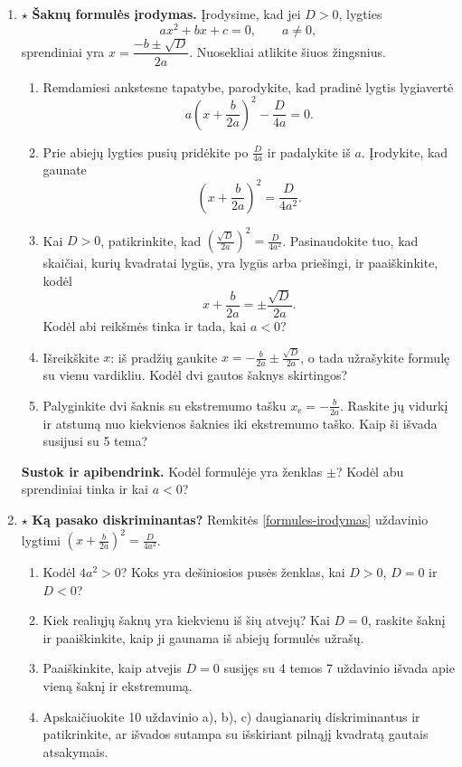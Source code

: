 \documentclass[12pt,a4paper]{article}
\begin{document}
\begin{enumerate}
\begin{enumerate}
\end{enumerate}
\item\label{formules-irodymas} $\star$ \textbf{Šaknų formulės įrodymas.} Įrodysime, kad jei $D>0$, lygties
\[
ax^2+bx+c=0,\qquad a\ne0,
\]
sprendiniai yra $x=\dfrac{-b\pm\sqrt D}{2a}$. Nuosekliai atlikite šiuos žingsnius.
\begin{enumerate}
\item Remdamiesi ankstesne tapatybe, parodykite, kad pradinė lygtis lygiavertė
\[
a\left(x+\frac{b}{2a}\right)^2-\frac{D}{4a}=0.
\]
\item Prie abiejų lygties pusių pridėkite po $\frac{D}{4a}$ ir padalykite iš $a$. Įrodykite, kad gaunate
\[
\left(x+\frac{b}{2a}\right)^2=\frac{D}{4a^2}.
\]
\item Kai $D>0$, patikrinkite, kad $\left(\frac{\sqrt D}{2a}\right)^2=\frac{D}{4a^2}$. Pasinaudokite tuo, kad skaičiai, kurių kvadratai lygūs, yra lygūs arba priešingi, ir paaiškinkite, kodėl
\[
x+\frac{b}{2a}=\pm\frac{\sqrt D}{2a}.
\]
Kodėl abi reikšmės tinka ir tada, kai $a<0$?
\item Išreikškite $x$: iš pradžių gaukite $x=-\frac{b}{2a}\pm\frac{\sqrt D}{2a}$, o tada užrašykite formulę su vienu vardikliu. Kodėl dvi gautos šaknys skirtingos?
\item Palyginkite dvi šaknis su ekstremumo tašku $x_{\mathrm e}=-\frac{b}{2a}$. Raskite jų vidurkį ir atstumą nuo kiekvienos šaknies iki ekstremumo taško. Kaip ši išvada susijusi su 5 tema?
\end{enumerate}
\par\medskip
\textbf{Sustok ir apibendrink.} Kodėl formulėje yra ženklas $\pm$? Kodėl abu sprendiniai tinka ir kai $a<0$?
\needspace{5cm}
\item $\star$ \textbf{Ką pasako diskriminantas?} Remkitės \ref{formules-irodymas} uždavinio lygtimi $\left(x+\frac{b}{2a}\right)^2=\frac{D}{4a^2}$.
\begin{enumerate}
\item Kodėl $4a^2>0$? Koks yra dešiniosios pusės ženklas, kai $D>0$, $D=0$ ir $D<0$?
\item Kiek realiųjų šaknų yra kiekvienu iš šių atvejų? Kai $D=0$, raskite šaknį ir paaiškinkite, kaip ji gaunama iš abiejų formulės užrašų.
\item Paaiškinkite, kaip atvejis $D=0$ susijęs su 4 temos 7 uždavinio išvada apie vieną šaknį ir ekstremumą.
\item Apskaičiuokite 10 uždavinio a), b), c) daugianarių diskriminantus ir patikrinkite, ar išvados sutampa su išskiriant pilnąjį kvadratą gautais atsakymais.

\end{enumerate}
\end{enumerate}
\end{document}
